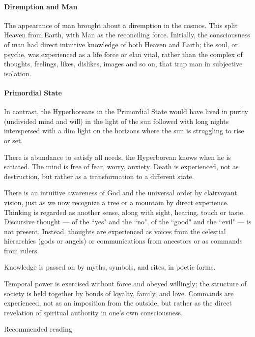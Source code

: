 \paragraph{Diremption and Man}
The appearance of man brought about a diremption in the cosmos. This split Heaven from Earth, with Man as the reconciling force. Initially, the consciousness of man had direct intuitive knowledge of both Heaven and Earth; the soul, or psyche, was experienced as a life force or elan vital, rather than the complex of thoughts, feelings, likes, dislikes, images and so on, that trap man in subjective isolation.

\paragraph{Primordial State}
In contrast, the Hyperboreans in the Primordial State would have lived in purity (undivided mind and will) in the light of the sun followed with long nights interspersed with a dim light on the horizons where the sun is struggling to rise or set.

There is abundance to satisfy all needs, the Hyperborean knows when he is satiated. The mind is free of fear, worry, anxiety. Death is experienced, not as destruction, but rather as a transformation to a different state.

There is an intuitive awareness of God and the universal order by clairvoyant vision, just as we now recognize a tree or a mountain by direct experience. Thinking is regarded as another sense, along with sight, hearing, touch or taste. Discursive thought — of the ``yes" and the ``no", of the ``good" and the ``evil" — is not present. Instead, thoughts are experienced as voices from the celestial hierarchies (gods or angels) or communications from ancestors or as commands from rulers.

Knowledge is passed on by myths, symbols, and rites, in poetic forms.

Temporal power is exercised without force and obeyed willingly; the structure of society is held together by bonds of loyalty, family, and love. Commands are experienced, not as an imposition from the outside, but rather as the direct revelation of spiritual authority in one's own consciousness.


\hfill

Recommended reading

